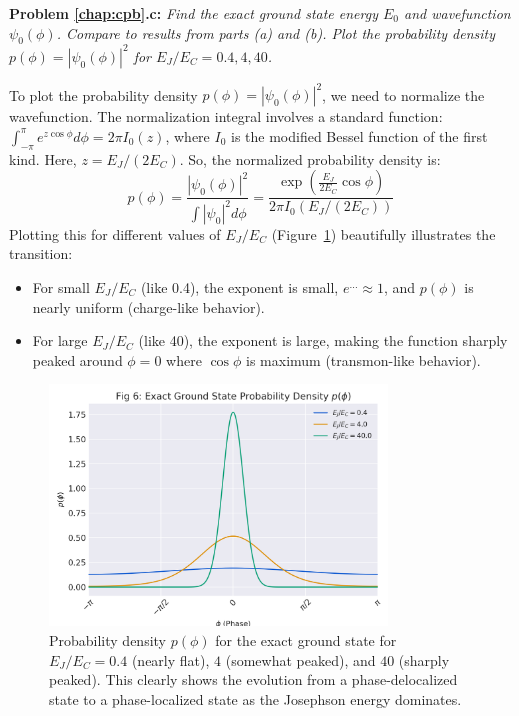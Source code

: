 \documentclass{book}
\newenvironment{problem}[1][Problem]{\par\medskip\noindent\textbf{#1:}\em}{\par\medskip}
\begin{document}
\begin{problem}[Problem \ref{chap:cpb}.c] 
Find the exact ground state energy \(E_0\) and wavefunction \(\psi_0(\phi)\). Compare to results from parts (a) and (b). Plot the probability density \(p(\phi) = |\psi_0(\phi)|^2\) for \(E_J / E_C = 0.4, 4, 40\).
\end{problem}

To plot the probability density \(p(\phi) = |\psi_0(\phi)|^2\), we need to normalize the wavefunction. The normalization integral involves a standard function: \(\int_{-\pi}^{\pi} e^{z \cos\phi} d\phi = 2\pi I_0(z)\), where \(I_0\) is the modified Bessel function of the first kind. Here, \(z = E_J / (2E_C)\). So, the normalized probability density is:
\begin{equation}
p(\phi) = \frac{|\psi_0(\phi)|^2}{\int |\psi_0|^2 d\phi} = \frac{\exp\left( \frac{E_J}{2 E_C} \cos \phi \right)}{2 \pi I_0(E_J / (2 E_C))}
\end{equation}
Plotting this for different values of \(E_J / E_C\) (Figure~\ref{fig:exact_probs}) beautifully illustrates the transition:
\begin{itemize}
    \item For small \(E_J / E_C\) (like 0.4), the exponent is small, \(e^{\dots} \approx 1\), and \(p(\phi)\) is nearly uniform (charge-like behavior).
    \item For large \(E_J / E_C\) (like 40), the exponent is large, making the function sharply peaked around \(\phi=0\) where \(\cos\phi\) is maximum (transmon-like behavior).
\end{itemize}

\begin{figure}[h]
    \centering
    \includegraphics[width=0.8\textwidth]{fig_exact_prob.png}
    \caption[Exact ground state probability density]{Probability density \(p(\phi)\) for the exact ground state for \(E_J / E_C = 0.4\) (nearly flat), \(4\) (somewhat peaked), and \(40\) (sharply peaked). This clearly shows the evolution from a phase-delocalized state to a phase-localized state as the Josephson energy dominates.}
    \label{fig:exact_probs}
\end{figure}
\end{document}
